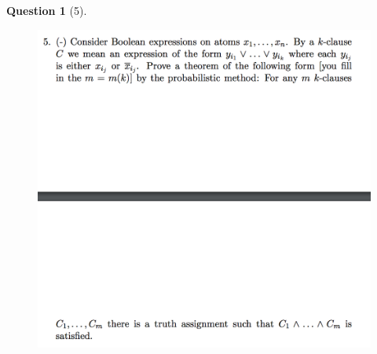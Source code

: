 \documentclass{article} %
\theoremstyle{quest}
\newtheorem*{question}{Question}
\begin{document}
\newpage

\begin{question}[5]
\hfill
\begin{figure}[h!]
  \centering
    \includegraphics[width=1\textwidth]{pm-1-5.png}
\end{figure}
\end{question}
\end{document}
